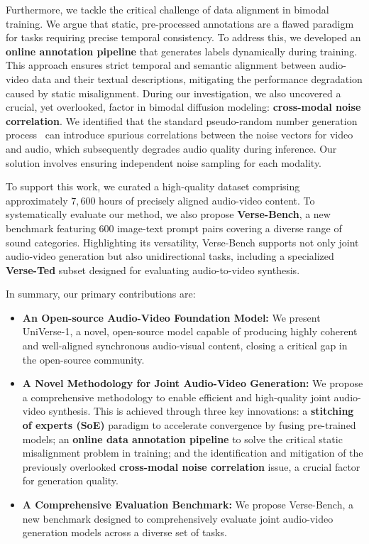Furthermore, we tackle the critical challenge of data alignment in bimodal training. We argue that static, pre-processed annotations are a flawed paradigm for tasks requiring precise temporal consistency. To address this, we developed an \textbf{online annotation pipeline} that generates labels dynamically during training. This approach ensures strict temporal and semantic alignment between audio-video data and their textual descriptions, mitigating the performance degradation caused by static misalignment. During our investigation, we also uncovered a crucial, yet overlooked, factor in bimodal diffusion modeling: \textbf{cross-modal noise correlation}. We identified that the standard pseudo-random number generation process~\cite{hamming1952mathematical} can introduce spurious correlations between the noise vectors for video and audio, which subsequently degrades audio quality during inference. Our solution involves ensuring independent noise sampling for each modality.

To support this work, we curated a high-quality dataset comprising approximately $7,600$ hours of precisely aligned audio-video content. To systematically evaluate our method, we also propose \textbf{Verse-Bench}, a new benchmark featuring $600$ image-text prompt pairs covering a diverse range of sound categories. Highlighting its versatility, Verse-Bench supports not only joint audio-video generation but also unidirectional tasks, including a specialized \textbf{Verse-Ted} subset designed for evaluating audio-to-video synthesis.

In summary, our primary contributions are:
\begin{itemize}[leftmargin=*]
    \item \textbf{An Open-source Audio-Video Foundation Model:} We present UniVerse-1, a novel, open-source model capable of producing highly coherent and well-aligned synchronous audio-visual content, closing a critical gap in the open-source community.
    
    \item \textbf{A Novel Methodology for Joint Audio-Video Generation:} We propose a comprehensive methodology to enable efficient and high-quality joint audio-video synthesis. This is achieved through three key innovations: a \textbf{stitching of experts (SoE)} paradigm to accelerate convergence by fusing pre-trained models; an \textbf{online data annotation pipeline} to solve the critical static misalignment problem in training; and the identification and mitigation of the previously overlooked \textbf{cross-modal noise correlation} issue, a crucial factor for generation quality.
    
    \item \textbf{A Comprehensive Evaluation Benchmark:} We propose Verse-Bench, a new benchmark designed to comprehensively evaluate joint audio-video generation models across a diverse set of tasks.
\end{itemize}